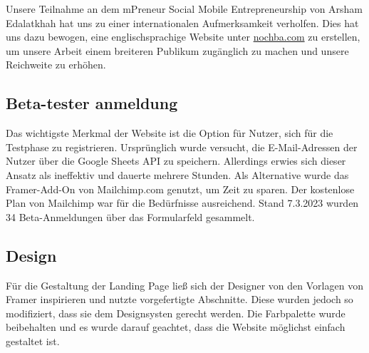 Unsere Teilnahme an dem mPreneur Social Mobile Entrepreneurship von Arsham Edalatkhah hat uns zu einer internationalen Aufmerksamkeit verholfen. Dies hat uns dazu bewogen, eine englischsprachige Website unter \href{https://nochba.com}{nochba.com} zu erstellen, um unsere Arbeit einem breiteren Publikum zugänglich zu machen und unsere Reichweite zu erhöhen.


\subsection{Beta-tester anmeldung}
Das wichtigste Merkmal der Website ist die Option für Nutzer, sich für die Testphase zu registrieren. Ursprünglich wurde versucht, die E-Mail-Adressen der Nutzer über die Google Sheets API zu speichern. Allerdings erwies sich dieser Ansatz als ineffektiv und dauerte mehrere Stunden. Als Alternative wurde das Framer-Add-On von Mailchimp.com genutzt, um Zeit zu sparen. Der kostenlose Plan von Mailchimp war für die Bedürfnisse ausreichend. Stand 7.3.2023 wurden 34 Beta-Anmeldungen über das Formularfeld gesammelt.


\subsection{Design}
Für die Gestaltung der Landing Page ließ sich der Designer
von den Vorlagen von Framer inspirieren und nutzte
vorgefertigte Abschnitte. Diese wurden jedoch so
modifiziert, dass sie dem Designsysten gerecht werden. Die
Farbpalette wurde beibehalten und es wurde darauf geachtet,
dass die Website möglichst einfach gestaltet ist.

